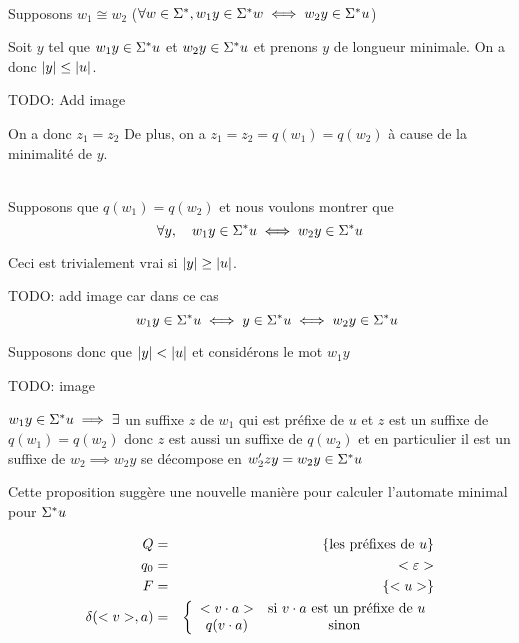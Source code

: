 \begin{proofI}
	\item \bimpLR \\
	Supposons $w_1 \cong w_2$ ($\forall w \in \Sigma^{*}, w_1y \in \Sigma^{*} w \iff w_2y\in \Sigma^{*} u$)

	Soit $y$ tel que $w_1 y \in \Sigma^{*} u$ et $w_2 y \in \Sigma^{*} u$ et prenons $y$ de longueur minimale.
	On a donc $|y| \leq |u|$.

	TODO: Add image

	On a donc $z_1 = z_2$
	De plus, on a $z_1 = z_2 = q(w_1) = q(w_2)$  à cause de la minimalité de $y$.

	\item \bimpRL \\
	Supposons que $q(w_1) = q(w_2)$ et nous voulons montrer que
	$$\forall y, \quad w_1 y \in \Sigma^{*} u \iff w_2 y \in \Sigma^{*} u$$

	Ceci est trivialement vrai si $|y| \geq |u|$.

	TODO: add image
	car dans ce cas
	$$\quad w_1 y \in \Sigma^{*} u \iff  y \in \Sigma^{*} u \iff w_2 y \in \Sigma^{*} u$$

	Supposons donc que $|y| < |u|$ et considérons le mot $w_1 y$

	TODO: image

	$w_1y \in \Sigma^{*} u \implies \exists$ un suffixe $z$ de $w_1$ qui est préfixe de $u$ et $z$ est un suffixe de $q(w_1) = q(w_2)$
	donc $z$ est aussi un suffixe de $q(w_2)$ et en particulier il est un suffixe de $w_2 \implies w_2 y $ se décompose en
	$w_2'zy = w_2 y \in \Sigma^{*} u$
\end{proofI}

Cette proposition suggère une nouvelle manière pour calculer l'automate minimal pour $\Sigma^{*} u$

\begin{eqnarray*}
	Q  &=& \left\{\text {les préfixes de } u\right\} \\
	q_0 &=& <\varepsilon> \\
	F &=& \left\{<u>\right\} \\
	\delta(<v>,a) &=&  \left\{ \begin{array}{cc}
		<v \cdot a>  & \text{si } v\cdot a \text{ est un préfixe de } u \\
		q(v \cdot a) & \text{sinon }
	\end{array}\right.
\end{eqnarray*}

